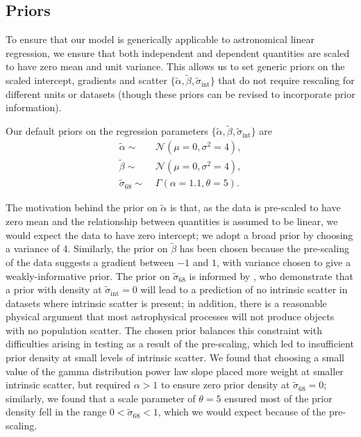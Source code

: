 \documentclass[fleqn,usenatbib]{rasti}
\newcommand{\intercept}{\alpha}
\newcommand{\covariate}{\beta}
\begin{document}
\subsection{Priors}
\label{sec:formalism.prior}

To ensure that our model is generically applicable to astronomical linear
regression, we ensure that both independent and dependent quantities are scaled
to have zero mean and unit variance. This allows us to set generic priors on the
scaled intercept, gradients and scatter $\{\tilde{\intercept},
\tilde{\covariate}, \tilde{\sigma}_{\text{int}}\}$ that do not require rescaling
for different units or datasets (though these priors can be revised to
incorporate prior information).

Our default priors on the regression parameters $\{\tilde{\intercept},
\tilde{\covariate}, \tilde{\sigma}_{\text{int}}\}$ are
\begin{align}
    \tilde{\intercept} \sim&\; \mathcal N(\mu = 0, \sigma^2 = 4), \\
    \tilde{\covariate} \sim&\; \mathcal N(\mu = 0, \sigma^2 = 4), \\
    \tilde{\sigma}_{68} \sim&\; \Gamma(\alpha = 1.1, \theta = 5).
\end{align}

The motivation behind the prior on $\tilde{\intercept}$ is that, as the data is
pre-scaled to have zero mean and the relationship between quantities is assumed
to be linear, we would expect the data to have zero intercept; we adopt a broad
prior by choosing a variance of 4. Similarly, the prior on $\tilde{\beta}$ has
been chosen because the pre-scaling of the data suggests a gradient between $-1$
and $1$, with variance chosen to give a weakly-informative prior. The prior on
$\tilde{\sigma}_{68}$ is informed by \citet{Chung:2013}, who demonstrate that a
prior with density at $\tilde{\sigma}_{\text{int}} = 0$ will lead to a
prediction of no intrinsic scatter in datasets where intrinsic scatter is
present; in addition, there is a reasonable physical argument that most
astrophysical processes will not produce objects with no population scatter. The
chosen prior balances this constraint with difficulties arising in testing as a
result of the pre-scaling, which led to insufficient prior density at small
levels of intrinsic scatter. We found that choosing a small value of the gamma
distribution power law slope placed more weight at smaller intrinsic scatter,
but required $\alpha > 1$ to ensure zero prior density at $\tilde{\sigma}_{68} =
0$; similarly, we found that a scale parameter of $\theta = 5$ ensured most of
the prior density fell in the range $0 < \tilde{\sigma}_{68} < 1$, which we
would expect because of the pre-scaling.
\end{document}
